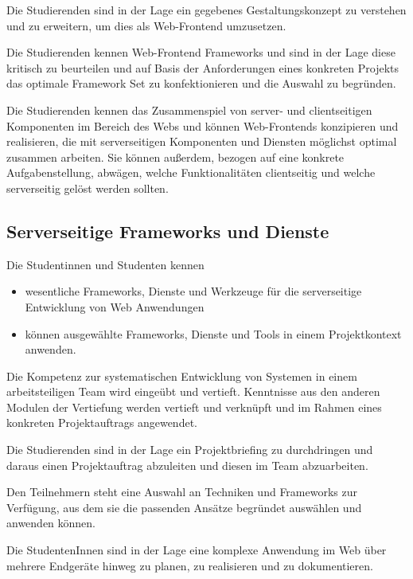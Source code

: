 Die Studierenden sind in der Lage ein gegebenes Gestaltungskonzept zu
verstehen und zu erweitern, um dies als Web-Frontend umzusetzen.

Die Studierenden kennen Web-Frontend Frameworks und sind in der Lage
diese kritisch zu beurteilen und auf Basis der Anforderungen eines
konkreten Projekts das optimale Framework Set zu konfektionieren und die
Auswahl zu begründen.

Die Studierenden kennen das Zusammenspiel von server- und clientseitigen
Komponenten im Bereich des Webs und können Web-Frontends konzipieren und
realisieren, die mit serverseitigen Komponenten und Diensten möglichst
optimal zusammen arbeiten. Sie können außerdem, bezogen auf eine
konkrete Aufgabenstellung, abwägen, welche Funktionalitäten clientseitig
und welche serverseitig gelöst werden sollten.

\subsection*{Serverseitige Frameworks und
Dienste\label{/mi-2017/modulbeschreibungen-bachelor/BA_Vertiefung-Web_Development}}\label{serverseitige-frameworks-und-dienstepathlabelmi-2017modulbeschreibungen-bachelorbaux5fvertiefung-webux5fdevelopment-1}

Die Studentinnen und Studenten kennen

\begin{itemize}
\tightlist
\item
  wesentliche Frameworks, Dienste und Werkzeuge für die serverseitige
  Entwicklung von Web Anwendungen
\item
  können ausgewählte Frameworks, Dienste und Tools in einem
  Projektkontext anwenden.
\end{itemize}

Die Kompetenz zur systematischen Entwicklung von Systemen in einem
arbeitsteiligen Team wird eingeübt und vertieft. Kenntnisse aus den
anderen Modulen der Vertiefung werden vertieft und verknüpft und im
Rahmen eines konkreten Projektauftrags angewendet.

Die Studierenden sind in der Lage ein Projektbriefing zu durchdringen
und daraus einen Projektauftrag abzuleiten und diesen im Team
abzuarbeiten.

Den Teilnehmern steht eine Auswahl an Techniken und Frameworks zur
Verfügung, aus dem sie die passenden Ansätze begründet auswählen und
anwenden können.

Die StudentenInnen sind in der Lage eine komplexe Anwendung im Web über
mehrere Endgeräte hinweg zu planen, zu realisieren und zu dokumentieren.

